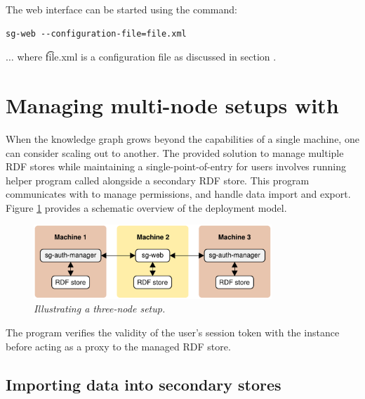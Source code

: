   The web interface can be started using the  command:

\begin{lstlisting}
sg-web --configuration-file=file.xml
\end{lstlisting}

  $\ldots{}$ where \t{file.xml} is a configuration file as
  discussed in section .

\pagebreak{}
\section{Managing multi-node setups with }

  When the knowledge graph grows beyond the capabilities of a single machine,
  one can consider scaling out to another.  The provided solution to manage
  multiple RDF stores while maintaining a single-point-of-entry for users
  involves running helper program called  alongside
  a secondary RDF store.  This program communicates with  to
  manage permissions, and handle data import and export.  Figure
  \ref{fig:sg-auth-manager} provides a schematic overview of the deployment
  model.

  \begin{figure}[H]
    \begin{center}
    \includegraphics[width=0.8\textwidth]{figures/sg-auth-manager-scaleout.pdf}
    \end{center}
    \caption{\textit{Illustrating a three-node setup.}}
    \label{fig:sg-auth-manager}
  \end{figure}


  The  program verifies the validity of the user's session
  token with the  instance before acting as a proxy to the managed
  RDF store.

\subsection{Importing data into secondary stores}

